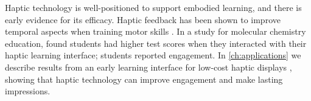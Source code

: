 Haptic technology is well-positioned to support embodied learning, and there is early evidence for its efficacy.
Haptic feedback has been shown to improve temporal aspects when training motor skills \cite{Feygin2002}.
In a study for molecular chemistry education, \citet{Sato2008} found students had higher test scores when they interacted with their haptic learning interface; students reported engagement.
In \autoref{ch:applications} we describe results from an early learning interface for low-cost haptic displays \cite{Martinez2016}, showing that haptic technology can improve engagement and make lasting impressions.





